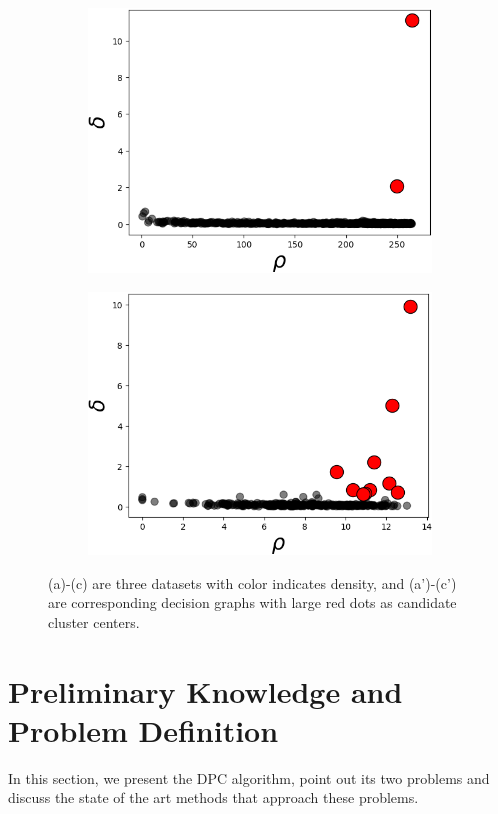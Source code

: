 \documentclass{llncs}
\begin{document}
\begin{figure}[ht]
\begin{subfigure}[t]{0.25\textwidth}
\includegraphics[width=1\textwidth]{image/dgf_dg_2.png}
\end{subfigure}
\begin{subfigure}[t]{0.25\textwidth}
\centering
\includegraphics[width=1\textwidth]{image/dgf_dg_0.png}
\end{subfigure}
\caption{(a)-(c) are three datasets with color indicates density, and (a')-(c') are corresponding decision graphs with large red dots as candidate cluster centers.}
\label{fig:dgf}
\end{figure}
%
\section{Preliminary Knowledge and Problem Definition}
In this section, we present the DPC algorithm, point out its two problems and discuss the state of the art methods that approach these problems.
%
\end{document}
